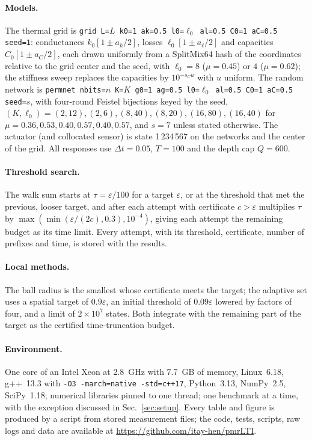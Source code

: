 \documentclass[aps,pra,superscriptaddress,floatfix,longbibliography,twocolumn]{revtex4-2}
\begin{document}
\paragraph*{Models.} The thermal grid is \texttt{grid L=$L$ k0=1 ak=0.5 l0=$\ell_0$ al=0.5 C0=1 aC=0.5 seed=1}: conductances $k_0[1\pm a_k/2]$, losses $\ell_0[1\pm a_\ell/2]$ and capacities $C_0[1\pm a_C/2]$, each drawn uniformly from a SplitMix64 hash of the coordinates relative to the grid center and the seed, with $\ell_0=8$ ($\mu=0.45$) or $4$ ($\mu=0.62$); the stiffness sweep replaces the capacities by $10^{-s_Cu}$ with $u$ uniform. The random network is \texttt{permnet nbits=$n$ K=$K$ g0=1 ag=0.5 l0=$\ell_0$ al=0.5 C0=1 aC=0.5 seed=$s$}, with four-round Feistel bijections keyed by the seed, $(K,\ell_0)=(2,12),(2,6),(8,40),(8,20),(16,80),(16,40)$ for $\mu=0.36,0.53,0.40,0.57,0.40,0.57$, and $s=7$ unless stated otherwise. The actuator (and collocated sensor) is state 1\,234\,567 on the networks and the center of the grid. All responses use $\Delta t=0.05$, $T=100$ and the depth cap $Q=600$.

\paragraph*{Threshold search.} The walk sum starts at $\tau=\varepsilon/100$ for a target $\varepsilon$, or at the threshold that met the previous, looser target, and after each attempt with certificate $c>\varepsilon$ multiplies $\tau$ by $\max(\min(\varepsilon/(2c),0.3),10^{-4})$, giving each attempt the remaining budget as its time limit. Every attempt, with its threshold, certificate, number of prefixes and time, is stored with the results.

\paragraph*{Local methods.} The ball radius is the smallest whose certificate meets the target; the adaptive set uses a spatial target of $0.9\varepsilon$, an initial threshold of $0.09\varepsilon$ lowered by factors of four, and a limit of $2\times10^7$ states. Both integrate with the remaining part of the target as the certified time-truncation budget.

\paragraph*{Environment.} One core of an Intel Xeon at 2.8~GHz with 7.7~GB of memory, Linux~6.18, g++~13.3 with \texttt{-O3 -march=native -std=c++17}, Python~3.13, NumPy~2.5, SciPy~1.18; numerical libraries pinned to one thread; one benchmark at a time, with the exception discussed in Sec.~\ref{sec:setup}. Every table and figure is produced by a script from stored measurement files; the code, tests, scripts, raw logs and data are available at \url{https://github.com/itay-hen/pmrLTI}.


\end{document}
